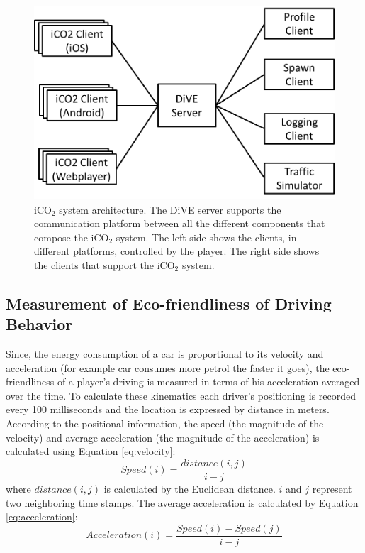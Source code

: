 \documentclass[preprint,authoryear,12pt]{elsarticle}
\begin{document}
\begin{figure}[htb]
\begin{center}
\includegraphics[width=.6\linewidth]{ijhcs14-img/iCO2_generalarchitecture}
\caption{iCO$_2$ system architecture. The DiVE server supports the communication platform between all the different components that compose the iCO$_2$ system. The left side shows the clients, in different platforms, controlled by the player. The right side shows the clients that support the iCO$_2$ system.\label{fig:iCO2_generalarchitecture}}
\end{center}
\end{figure}


\subsection{Measurement of Eco-friendliness of Driving Behavior}
\label{sec:measureEco}

Since, the energy consumption of a car is proportional to its velocity and acceleration (for example car consumes more petrol the faster it goes), the eco-friendliness of a player's driving is measured in terms of his acceleration averaged over the time.  To calculate these kinematics each driver's positioning is recorded every 100 milliseconds and the location is expressed by distance in meters. According to the positional information, the speed (the magnitude of the velocity) and average acceleration (the magnitude of the acceleration) is calculated using Equation \ref{eq:velocity}:
\begin{equation}\label{eq:velocity}
Speed(i) = \frac{distance(i,j)}{i-j}
\end{equation}
where $distance(i,j)$ is calculated by the Euclidean distance. $i$ and $j$ represent two neighboring time stamps. The average acceleration is calculated by Equation \ref{eq:acceleration}:
\begin{equation}\label{eq:acceleration}
Acceleration(i) = \frac{Speed(i) - Speed(j)}{i-j}
\end{equation}
\end{document}
